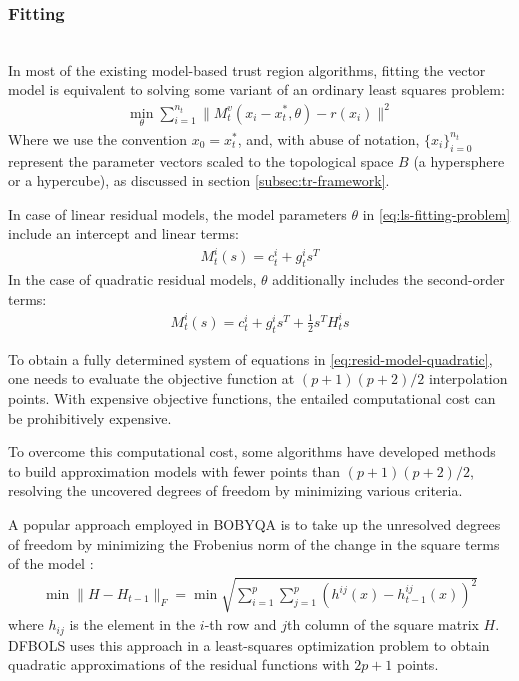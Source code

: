 \subsubsection{Fitting}
\label{subsubsec:fitting}
\hfill\\


In most of the existing model-based trust region algorithms, fitting the vector model is equivalent to solving some variant of an ordinary least squares problem:
\begin{align}
    \min\limits_{\theta}\sum\limits_{i=1}^{n_t}\lVert M_t^v(x_i-x_t^*,\theta)-r(x_i)\rVert^2
    \label{eq:ls-fitting-problem}
\end{align}
Where we use the convention $x_0=x_t^*$, and, with abuse of notation, $\{x_i\}_{i=0}^{n_t}$ represent the parameter vectors scaled to the topological space $B$ (a hypersphere or a hypercube), as discussed in section \ref{subsec:tr-framework}.

In case of linear residual models, the model parameters $\theta$ in \ref{eq:ls-fitting-problem} include an intercept and linear terms:
\begin{align}
    M_t^i(s)= c^i_t+g_t^is^T
    \label{eq:resid-model-linear}
\end{align}
In the case of quadratic residual models, $\theta$ additionally includes the second-order terms:
\begin{align}
    M_t^i(s)= c^i_t+g_t^is^T+\frac{1}{2}s^TH_t^is
    \label{eq:resid-model-quadratic}
\end{align}

To obtain a fully determined system of equations in \ref{eq:resid-model-quadratic}, one needs to evaluate the objective function at $(p+1)(p+2)/2$ interpolation points. With expensive objective functions, the entailed computational cost can be prohibitively expensive.

To overcome this computational cost, some algorithms have developed methods to build approximation models with fewer points than  $(p+1)(p+2)/2$, resolving the uncovered degrees of freedom by minimizing various criteria.

A popular approach employed in BOBYQA is to take up the unresolved degrees of freedom by minimizing the Frobenius norm of the change in the square terms of the model \citep{Powell2003}:
\begin{align}
    \min\lVert H-H_{t-1}\rVert_F = \min\sqrt{\sum\limits_{i=1}^p\sum\limits_{j=1}^{p}(h^{ij}(x)-h^{ij}_{t-1}(x))^2}
    \label{eq:min-frob-diff}
\end{align}
where $h_{ij}$ is the element in the $i$-th row and $j$th column of the square matrix $H$. DFBOLS \citep{Zhang2010} uses this approach in a least-squares optimization problem to obtain quadratic approximations of the residual functions with $2p+1$ points.

